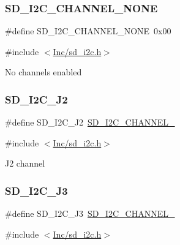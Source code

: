 \subsubsection{\texorpdfstring{S\+D\+\_\+\+I2\+C\+\_\+\+C\+H\+A\+N\+N\+E\+L\+\_\+\+N\+O\+NE}{SD\_I2C\_CHANNEL\_NONE}}
{\footnotesize\ttfamily \#define S\+D\+\_\+\+I2\+C\+\_\+\+C\+H\+A\+N\+N\+E\+L\+\_\+\+N\+O\+NE~0x00}



{\ttfamily \#include $<$\mbox{\hyperlink{sd__i2c_8h}{Inc/sd\+\_\+i2c.\+h}}$>$}

No channels enabled \mbox{\label{group___s_d___i2_c___defines_gae83d6a783674f5c291725a70c3ab25b6}} 
\subsubsection{\texorpdfstring{S\+D\+\_\+\+I2\+C\+\_\+\+J2}{SD\_I2C\_J2}}
{\footnotesize\ttfamily \#define S\+D\+\_\+\+I2\+C\+\_\+\+J2~\mbox{\hyperlink{group___s_d___i2_c___defines_ga26027bd1cdd514db775ea1bd71c0a6e5}{S\+D\+\_\+\+I2\+C\+\_\+\+C\+H\+A\+N\+N\+E\+L\+\_}}}



{\ttfamily \#include $<$\mbox{\hyperlink{sd__i2c_8h}{Inc/sd\+\_\+i2c.\+h}}$>$}

J2 channel \mbox{\label{group___s_d___i2_c___defines_gaf1e13fcf962f7b34314d580f869539c9}} 
\subsubsection{\texorpdfstring{S\+D\+\_\+\+I2\+C\+\_\+\+J3}{SD\_I2C\_J3}}
{\footnotesize\ttfamily \#define S\+D\+\_\+\+I2\+C\+\_\+\+J3~\mbox{\hyperlink{group___s_d___i2_c___defines_ga0b586488f6f2252262b412db53e9008f}{S\+D\+\_\+\+I2\+C\+\_\+\+C\+H\+A\+N\+N\+E\+L\+\_}}}



{\ttfamily \#include $<$\mbox{\hyperlink{sd__i2c_8h}{Inc/sd\+\_\+i2c.\+h}}$>$}

